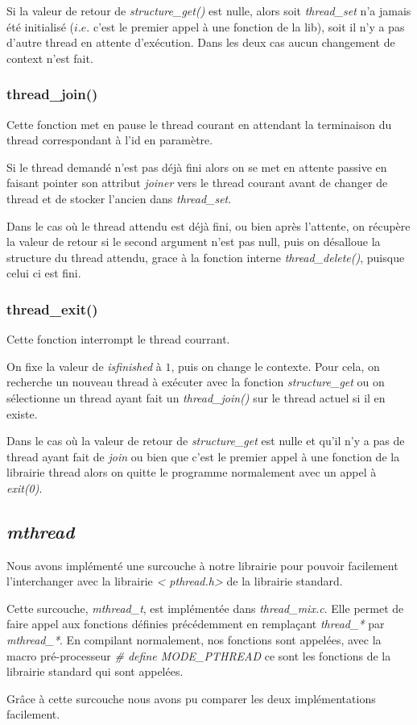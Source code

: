 Si la valeur de retour de \textit{structure\_get()} est
nulle, alors soit \textit{thread\_set} n'a jamais été initialisé
($i.e.$ c'est le premier appel à une fonction de la lib), soit il n'y
a pas d'autre thread en attente d'exécution. Dans les deux cas
aucun changement de context n'est fait.

\subsubsection{thread\_join()}
Cette fonction met en pause le thread courant en attendant la
terminaison du thread correspondant à l'id en paramètre.

Si le thread demandé n'est pas déjà fini alors on se met en attente
passive en faisant pointer son attribut \textit{joiner} vers le thread
courant avant de changer de thread et de stocker l'ancien dans
\textit{thread\_set}.

Dans le cas où le thread attendu est déjà fini, ou bien après
l'attente, on récupère la valeur de retour si le second argument n'est
pas null, puis on désalloue la structure du thread attendu, grace à la
fonction interne \textit{thread\_delete()}, puisque celui ci est fini.


\subsubsection{thread\_exit()}
Cette fonction interrompt le thread courrant.

On fixe la valeur de \textit{isfinished} à $1$, puis on change le
contexte. Pour cela, on recherche un nouveau thread à exécuter avec la
fonction \textit{structure\_get} ou on sélectionne un
thread ayant fait un \textit{thread\_join()} sur le thread actuel si
il en existe.

Dans le cas où la valeur de retour de
\textit{structure\_get} est nulle et qu'il n'y a pas de
thread ayant fait de \textit{join} ou bien que c'est le premier appel à une
fonction de la librairie thread alors on quitte le programme
normalement avec un appel à \textit{exit(0)}.


\subsection{\textit{mthread}}
Nous avons implémenté une surcouche à notre librairie pour pouvoir
facilement l'interchanger avec la librairie \textit{\textless
 pthread.h\textgreater} de la librairie standard.

Cette surcouche, \textit{mthread\_t}, est implémentée dans
\textit{thread\_mix.c}.  Elle permet de faire appel aux fonctions
définies précédemment en remplaçant \textit{thread\_*} par
\textit{mthread\_*}. En compilant normalement, nos fonctions sont
appelées, avec la macro pré-processeur \textit{\# define MODE\_PTHREAD} ce
sont les fonctions de la librairie standard qui sont appelées.

Grâce à cette surcouche nous avons pu comparer les deux implémentations facilement.

